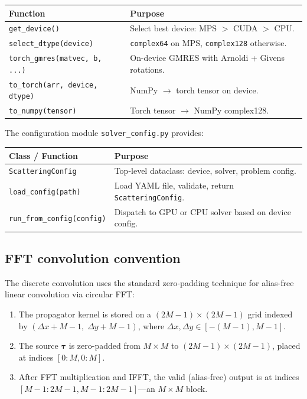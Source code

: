 \documentclass[11pt,a4paper]{article}
\newcommand{\D}{\Delta}
\begin{document}
\begin{center}
\renewcommand{\arraystretch}{1.2}
\begin{tabular}{lp{8.5cm}}
\toprule
\textbf{Function} & \textbf{Purpose} \\
\midrule
\texttt{get\_device()} &
  Select best device: MPS $>$ CUDA $>$ CPU. \\
\texttt{select\_dtype(device)} &
  \texttt{complex64} on MPS, \texttt{complex128} otherwise. \\
\texttt{torch\_gmres(matvec, b, ...)} &
  On-device GMRES with Arnoldi + Givens rotations. \\
\texttt{to\_torch(arr, device, dtype)} &
  NumPy $\to$ torch tensor on device. \\
\texttt{to\_numpy(tensor)} &
  Torch tensor $\to$ NumPy complex128. \\
\bottomrule
\end{tabular}
\end{center}

\noindent
The configuration module \texttt{solver\_config.py} provides:

\begin{center}
\renewcommand{\arraystretch}{1.2}
\begin{tabular}{lp{8.5cm}}
\toprule
\textbf{Class / Function} & \textbf{Purpose} \\
\midrule
\texttt{ScatteringConfig} &
  Top-level dataclass: device, solver, problem config. \\
\texttt{load\_config(path)} &
  Load YAML file, validate, return \texttt{ScatteringConfig}. \\
\texttt{run\_from\_config(config)} &
  Dispatch to GPU or CPU solver based on device config. \\
\bottomrule
\end{tabular}
\end{center}

\subsection{FFT convolution convention}

The discrete convolution uses the standard zero-padding technique
for alias-free linear convolution via circular FFT:

\begin{enumerate}[nosep]
  \item The propagator kernel is stored on a $(2M{-}1) \times (2M{-}1)$
    grid indexed by $(\D x + M{-}1,\; \D y + M{-}1)$, where
    $\D x, \D y \in [-(M{-}1), M{-}1]$.
  \item The source $\bm{\tau}$ is zero-padded from $M \times M$ to
    $(2M{-}1) \times (2M{-}1)$, placed at indices $[0:M, 0:M]$.
  \item After FFT multiplication and IFFT, the valid (alias-free)
    output is at indices $[M{-}1 : 2M{-}1, M{-}1 : 2M{-}1]$---an
    $M \times M$ block.
\end{enumerate}
\end{document}

